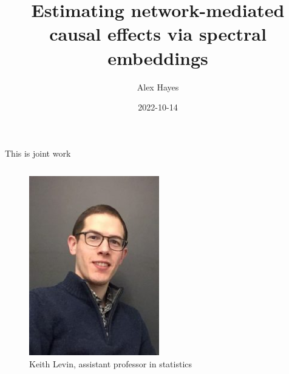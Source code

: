 \documentclass{beamer}
\title{Estimating network-mediated causal effects via spectral embeddings}
\date{2022-10-14}
\author{Alex Hayes}
\institute{University of Wisconsin-Madison}
\theoremstyle{remark}
\begin{document}
\maketitle


\begin{frame}{This is joint work}
    \begin{columns}


        \begin{figure}
            \includegraphics[width=0.8\textwidth]{figures/keith.jpg}
            \caption{Keith Levin, assistant professor in statistics}
        \end{figure}



\end{columns}
\end{frame}
\end{document}
